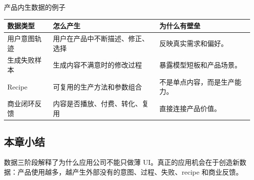 \begin{knowledgebox}{产品内生数据的例子}
\begin{tabularx}{\textwidth}{p{}p{}X}
\toprule
数据类型 & 怎么产生 & 为什么有壁垒 \\
\midrule
用户意图轨迹 & 用户在产品中不断描述、修正、选择 & 反映真实需求和偏好。 \\
生成失败样本 & 生成内容不满意时的修改过程 & 暴露模型短板和产品场景。 \\
Recipe & 可复用的生产方法和参数组合 & 不是单点内容，而是生产能力。 \\
商业闭环反馈 & 内容是否播放、付费、转化、复用 & 直接连接产品价值。 \\
\bottomrule
\end{tabularx}
\end{knowledgebox}

\subsection{本章小结}

数据三阶段解释了为什么应用公司不能只做薄 UI。真正的应用机会在于创造新数据：产品使用越多，越产生外部没有的意图、过程、失败、recipe 和商业反馈。

